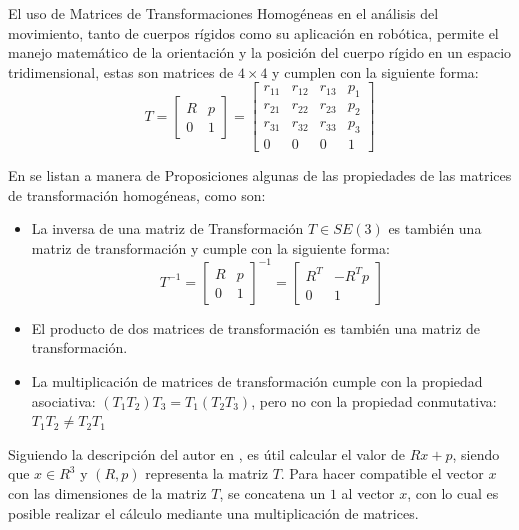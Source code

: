 El uso de Matrices de Transformaciones Homogéneas en el análisis del movimiento, tanto de cuerpos rígidos como su aplicación en robótica, permite el manejo matemático de la orientación y la posición del cuerpo rígido en un espacio tridimensional, estas son matrices de $4 \times 4$ y cumplen con la siguiente forma:\\

\begin{equation*}
	T = 
    \begin{bmatrix}
	R & p\\
	0 & 1 
	\end{bmatrix} = 
    \begin{bmatrix}
	r_{11} & r_{12} & r_{13} & p_{1}\\
	r_{21} & r_{22} & r_{23} & p_{2}\\
	r_{31} & r_{32} & r_{33} & p_{3}\\
	0 & 0 & 0 & 1 
	\end{bmatrix}
\end{equation*}

En \cite{lynch_modern_2017} se listan a manera de Proposiciones algunas de las propiedades de las matrices de transformación homogéneas, como son:\\
\begin{itemize}
    \item La inversa de una matriz de Transformación $T \in SE(3)$ es también una matriz de transformación y cumple con la siguiente forma:
    \begin{equation*}
        T^{-1} = 
    \begin{bmatrix}
	R & p\\
	0 & 1 
	\end{bmatrix}^{-1} = 
    \begin{bmatrix}
	R^{T} & -R^{T}p\\
	0 & 1 
	\end{bmatrix}
    \end{equation*}
    \item El producto de dos matrices de transformación es también una matriz de transformación.
    \item La multiplicación de matrices de transformación cumple con la propiedad asociativa: $(T_{1}T_{2})T_{3}=T_{1}(T_{2}T_{3})$, pero no con la propiedad conmutativa: $T_{1}T_{2}\neq T_{2}T_{1}$  
\end{itemize}

Siguiendo la descripción del autor en \cite{lynch_modern_2017}, es útil calcular el valor de $Rx+p$, siendo que $x \in R^{3}$ y $(R,p)$ representa la matriz $T$. Para hacer compatible el vector $x$ con las dimensiones de la matriz $T$, se concatena un $1$ al vector $x$, con lo cual es posible realizar el cálculo mediante una multiplicación de matrices.

